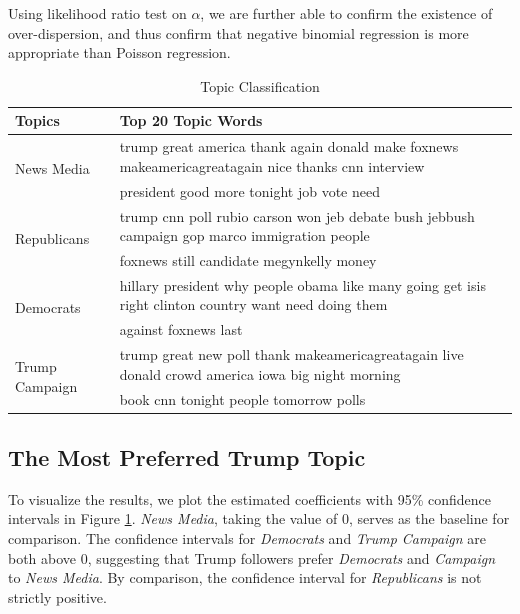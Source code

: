 \documentclass[letterpaper]{article}
\begin{document}
Using likelihood ratio test on $\alpha$, we are further able to confirm the existence of over-dispersion, and thus confirm that negative binomial regression is more appropriate than Poisson regression. 

\begin{table}[]
\renewcommand{\arraystretch}{1}
\setlength{\tabcolsep}{3.5pt}
\centering
\caption{Topic Classification}
\label{topics}
\begin{tabular}{ll}
\hline\hline
Topics                        & Top 20 Topic Words                                                                            \\
\hline
\multirow{2}{*}{News Media}   & trump great america thank again donald make foxnews makeamericagreatagain                      nice thanks cnn interview\\
                              & president good more tonight job vote need \\\hline %
                               
\multirow{2}{*}{Republicans}  & trump cnn poll rubio carson won jeb debate bush jebbush campaign gop marco immigration  people \\
                              & foxnews still candidate megynkelly money \\\hline%
\multirow{2}{*}{Democrats}    & hillary president why people obama like many going get isis right clinton country want       need doing them\\
                              & against foxnews last \\\hline %
\multirow{2}{*}{Trump Campaign} & trump great new poll thank makeamericagreatagain live donald crowd america iowa               big night morning \\
                              & book cnn tonight people tomorrow polls \\\hline\hline %
                        
\end{tabular}
\end{table}

\subsection{The Most Preferred Trump Topic}
To visualize the results, we plot the estimated coefficients with 95\% confidence intervals in Figure \ref{topics}. \textit{News Media}, taking the value of 0, serves as the baseline for comparison. The confidence intervals for \textit{Democrats} and \textit{Trump Campaign} are both above 0, suggesting that Trump followers prefer \textit{Democrats} and  \textit{Campaign} to \textit{News Media}. By comparison, the confidence interval for \textit{Republicans} is not strictly positive. 
\end{document}
